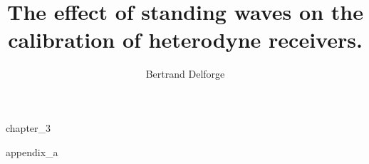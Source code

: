 \documentclass[a4paper,11pt]{book}
\title{The effect of standing waves on the calibration of heterodyne receivers.}
\author{Bertrand Delforge}
\begin{document}
\frontmatter
\maketitle
\tableofcontents

\listoffigures
\listofalgorithms


\mainmatter

{chapter_3}

\begin{appendices}
{appendix_a}
\end{appendices}

\backmatter

%

\cleardoublepage
{}
\printindex

\cleardoublepage
{}
%
\printbibliography
\end{document}
